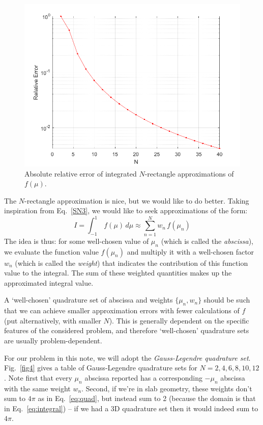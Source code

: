 \documentclass{article}
\begin{document}
\begin{figure}[h!]
	\centering
	\includegraphics[width=0.6\linewidth]{images/fig3.png}
	\caption{Absolute relative error of integrated $N$-rectangle approximations of $f(\mu)$.}
	\label{fig3}
\end{figure}

The $N$-rectangle approximation is nice, but we would like to do better. Taking inspiration from Eq.~\eqref{SN3}, we would like to seek approximations of the form:
\begin{equation}\label{eq:integral}
	I=\int_{-1}^1\,f(\mu)\,d\mu\approx\sum_{n=1}^N w_n\,f(\mu_n)
\end{equation}
The idea is thus: for some well-chosen value of $\mu_n$ (which is called the \textit{abscissa}), we evaluate the function value $f(\mu_n)$ and multiply it with a well-chosen factor $w_n$ (which is called the \textit{weight}) that indicates the contribution of this function value to the integral. The sum of these weighted quantities makes up the approximated integral value.

A `well-chosen' quadrature set of abscissa and weights $\{\mu_n,w_n\}$ should be such that we can achieve smaller approximation errors with fewer calculations of $f$ (put alternatively, with smaller $N$). This is generally dependent on the specific features of the considered problem, and therefore `well-chosen' quadrature sets are usually problem-dependent.

For our problem in this note, we will adopt the \textit{Gauss-Legendre quadrature set}. Fig.~\ref{fig4} gives a table of Gauss-Legendre quadrature sets for $N=2,4,6,8,10,12$. Note first that every $\mu_n$ abscissa reported has a corresponding $-\mu_n$ abscissa with the same weight $w_n$. Second, if we're in slab geometry, these weights don't sum to $4\pi$ as in Eq.~\eqref{eq:quad}, but instead sum to 2 (because the domain is that in Eq.~\eqref{eq:integral}) -- if we had a 3D quadrature set then it would indeed sum to $4\pi$. 
\end{document}
